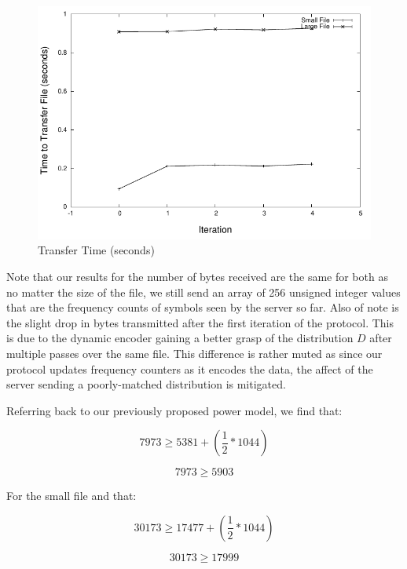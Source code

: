 \documentclass[conference]{IEEEtran}
\begin{document}
\begin{figure}[!t]
\centering
\includegraphics[scale=0.63]{images/latency.pdf}
\caption{Transfer Time (seconds)}
\label{fig:latency}
\end{figure}

Note that our results for the number of bytes received are the same for both 
as no matter the size of the file, we still send an array of 256 unsigned 
integer values that are the frequency counts of symbols seen by the server so
far.  Also of note is the slight drop in bytes transmitted after the first 
iteration of the protocol.  This is due to the dynamic encoder gaining a better
grasp of the distribution $D$ after multiple passes over the same file.  This 
difference is rather muted as since our protocol updates frequency counters
as it encodes the data, the affect of the server sending a poorly-matched 
distribution is mitigated.

Referring back to our previously proposed power model, we find that:

\begin{equation}
7973 \geq 5381 + (\frac{1}{2} * 1044)
\end{equation}

\begin{equation}
7973 \geq 5903
\end{equation}

For the small file and that:

\begin{equation}
30173 \geq 17477 + (\frac{1}{2} * 1044)
\end{equation}

\begin{equation}
30173 \geq 17999
\end{equation}
\end{document}
